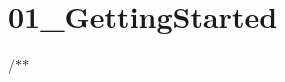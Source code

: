 \chapter{01\+\_\+\+Getting\+Started}
\hypertarget{md_pages_201___getting_started}{}\label{md_pages_201___getting_started}
/\texorpdfstring{$\ast$}{*}\texorpdfstring{$\ast$}{*} 